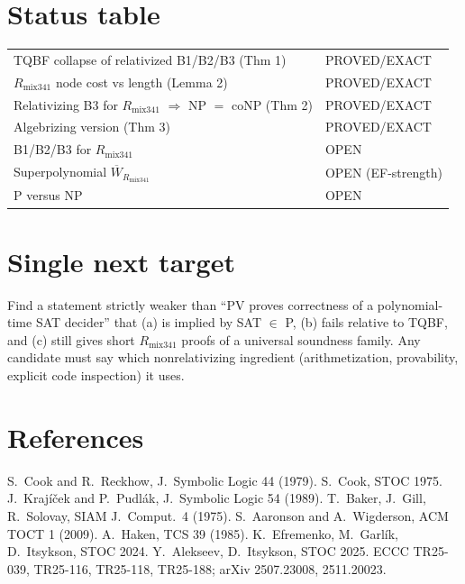 \documentclass[11pt]{article}
\newcommand{\Wb}{\overline W}
\newcommand{\Rmix}{R_{\mathrm{mix341}}}
\begin{document}
\section*{Status table}
\begin{tabular}{ll}
TQBF collapse of relativized B1/B2/B3 (Thm 1) & PROVED/EXACT\\
$\Rmix$ node cost vs length (Lemma 2) & PROVED/EXACT\\
Relativizing B3 for $\Rmix$ $\Rightarrow$ NP $=$ coNP (Thm 2) & PROVED/EXACT\\
Algebrizing version (Thm 3) & PROVED/EXACT\\
B1/B2/B3 for $\Rmix$ & OPEN\\
Superpolynomial $\Wb_{\Rmix}$ & OPEN (EF-strength)\\
P versus NP & OPEN
\end{tabular}

\section*{Single next target}
Find a statement strictly weaker than ``PV proves correctness of a polynomial-time SAT
decider'' that (a) is implied by SAT $\in$ P, (b) fails relative to TQBF, and (c) still
gives short $\Rmix$ proofs of a universal soundness family. Any candidate must say
which nonrelativizing ingredient (arithmetization, provability, explicit code inspection)
it uses.

\section*{References}
S.~Cook and R.~Reckhow, J.\ Symbolic Logic 44 (1979). S.~Cook, STOC 1975.
J.~Krajíček and P.~Pudlák, J.\ Symbolic Logic 54 (1989). T.~Baker, J.~Gill, R.~Solovay,
SIAM J.\ Comput.\ 4 (1975). S.~Aaronson and A.~Wigderson, ACM TOCT 1 (2009).
A.~Haken, TCS 39 (1985). K.~Efremenko, M.~Garl\'ik, D.~Itsykson, STOC 2024.
Y.~Alekseev, D.~Itsykson, STOC 2025. ECCC TR25-039, TR25-116, TR25-118, TR25-188;
arXiv 2507.23008, 2511.20023.
\end{document}
